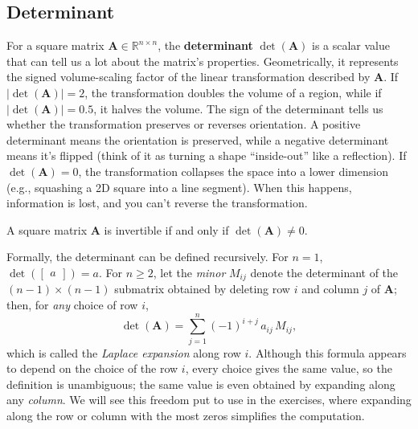 \subsection{Determinant}
For a square matrix $ \mathbf{A} \in \mathbb{R}^{n\times n} $, the \textbf{determinant} $ \det(\mathbf{A}) $ is a scalar value that can tell us a lot about the matrix's properties. Geometrically, it represents the signed volume-scaling factor of the linear transformation described by $ \mathbf{A} $. If $ |\det(\mathbf{A})| = 2 $, the transformation doubles the volume of a region, while if $ |\det(\mathbf{A})| = 0.5 $, it halves the volume. The sign of the determinant tells us whether the transformation preserves or reverses orientation. A positive determinant means the orientation is preserved, while a negative determinant means it's flipped (think of it as turning a shape ``inside-out'' like a reflection). If $ \det(\mathbf{A}) = 0 $, the transformation collapses the space into a lower dimension (e.g., squashing a 2D square into a line segment). When this happens, information is lost, and you can't reverse the transformation.
\begin{theoremBox}
\begin{theorem}
A square matrix $\mathbf{A}$ is invertible if and only if $\det(\mathbf{A}) \neq 0$.
\end{theorem}
\end{theoremBox}

Formally, the determinant can be defined recursively.
For $n = 1$, $\det(\begin{bmatrix} a \end{bmatrix}) = a$.
For $n \geq 2$, let the \emph{minor} $M_{ij}$ denote the determinant of the $(n-1) \times (n-1)$ submatrix obtained by deleting row $i$ and column $j$ of $\mathbf{A}$; then, for \emph{any} choice of row $i$,
\begin{equation*}
    \det(\mathbf{A}) = \sum_{j=1}^{n} (-1)^{i+j}\, a_{ij}\, M_{ij},
\end{equation*}
which is called the \emph{Laplace expansion} along row $i$.
Although this formula appears to depend on the choice of the row $i$, every choice gives the same value, so the definition is unambiguous; the same value is even obtained by expanding along any \emph{column}.
We will see this freedom put to use in the exercises, where expanding along the row or column with the most zeros simplifies the computation.

